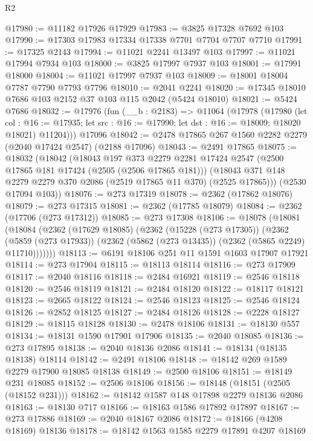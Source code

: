 \begin{lexlean}{R2}
\begin{coremodule}
@17980 := @11182 @17926 @17929
@17983 := @3825 @17328 @7692 @103
@17990 := @17303 @17983 @17334 @17338 @7701 @7704 @7707 @7710
@17991 := @17325 @2143
@17994 := @11021 @2241 @13497 @103
@17997 := @11021 @17994 @7934 @103
@18000 := @3825 @17997 @7937 @103
@18001 := @17991 @18000
@18004 := @11021 @17997 @7937 @103
@18009 := @18001 @18004 @7787 @7790 @7793 @7796
@18010 := @2041 @2241
@18020 := @17345 @18010 @7686 @103 @2152 @37 @103 @115 @2042 (@5424 @18010)
@18021 := @5424 @7686
@18032 := @17976
    (fun (__b : @2183) =>
    @11064
      (@17978
        (@17980
          (let col : @16 := @17935; let src : @16 := @17990; let dst : @16 := @18009; @18020 @18021)
          @11204)))
    @17096
@18042 := @2478 @17865 @267 @1560 @2282 @2279 (@2040 @17424 @2547) (@2188 @17096)
@18043 := @2491 @17865
@18075 := @18032
    (@18042
      (@18043
        @197
        @373
        @2279
        @2281
        @17424
        @2547
        (@2500 @17865 @181 @17424 (@2505 (@2506 @17865 @181)))
        (@18043 @371 @148 @2279 @2279 @370 @2086 (@2519 @17865 @11 @370) (@2525 @17865)))
      (@2530 @17094 @103))
@18076 := @273 @17319
@18078 := @2362 (@17862 @18076)
@18079 := @273 @17315
@18081 := @2362 (@17785 @18079)
@18084 := @2362 (@17706 (@273 @17312))
@18085 := @273 @17308
@18106 := @18078
    (@18081
      (@18084
        (@2362
          (@17629 @18085)
          (@2362
            (@15228 (@273 @17305))
            (@2362
              (@5859 (@273 @17933))
              (@2362 (@5862 (@273 @13435)) (@2362 (@5865 @2249) @11710)))))))
@18113 := @6191 @18106 @251 @11 @1591 @1603 @17907 @17921
@18114 := @273 @17904
@18115 := @18113 @18114
@18116 := @273 @17909
@18117 := @2040 @18116
@18118 := @2484 @16921
@18119 := @2546 @18118
@18120 := @2546 @18119
@18121 := @2484 @18120
@18122 := @18117 @18121
@18123 := @2665 @18122
@18124 := @2546 @18123
@18125 := @2546 @18124
@18126 := @2852 @18125
@18127 := @2484 @18126
@18128 := @2228 @18127
@18129 := @18115 @18128
@18130 := @2478 @18106
@18131 := @18130 @557
@18134 := @18131 @1590 @17901 @17906
@18135 := @2040 @18085
@18136 := @273 @17895
@18138 := @2040 @18136 @2086
@18141 := @18134 (@18135 @18138) @18114
@18142 := @2491 @18106
@18148 := @18142 @269 @1589 @2279 @17900 @18085 @18138
@18149 := @2500 @18106
@18151 := @18149 @231 @18085
@18152 := @2506 @18106
@18156 := @18148 (@18151 (@2505 (@18152 @231)))
@18162 := @18142 @1587 @148 @17898 @2279 @18136 @2086
@18163 := @18130 @717
@18166 := @18163 @1586 @17892 @17897
@18167 := @273 @17886
@18169 := @2040 @18167 @2086
@18172 := @18166 (@4208 @18169) @18136
@18178 := @18142 @1563 @1585 @2279 @17891 @4207 @18169

\end{coremodule}
\end{lexlean}
